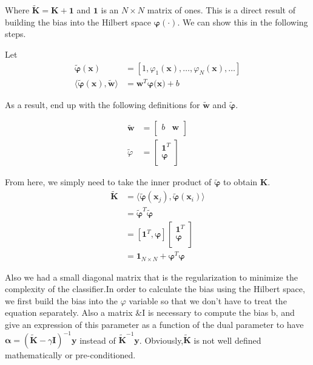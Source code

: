 \documentclass[conference]{IEEEtran}
\begin{document}
Where $\mathbf{\widetilde{K}} = \mathbf{K} + \mathbf{1}$ and $\mathbf{1}$ is an $N \times N$ matrix of ones. This is a direct result
of building the bias into the Hilbert space $\mathbf{\varphi(\cdot)}$. We can show this in the following steps. 

Let 
\begin{align*}
\mathbf{\widetilde{\varphi}(x)} &= [1, \varphi_1(\mathbf{x}),  \ldots, \varphi_N(\mathbf{x}), \ldots ] \\
\langle\mathbf{\widetilde{\varphi}(x)}, \mathbf{\widetilde{w}} \rangle &= \mathbf{w}^T\mathbf{\varphi(\mathbf{x}}) + b 
\end{align*}

As a result, end up with the following definitions for $\mathbf{\widetilde{w}}$ and $\mathbf{\widetilde{\varphi}}$.
\newcommand{\newPhi}{\mathbf{\widetilde{\varphi}}}

\begin{align*}
 \mathbf{\widetilde{w}} &= 
\begin{bmatrix}
b & \mathbf{w}  \\
\end{bmatrix} \\
\widetilde{\varphi} &= 
\begin{bmatrix} 
\mathbf{1}^T \\
\mathbf{\varphi} \\
\end{bmatrix}
\end{align*}

From here, we simply need to take the inner product of $\mathbf{\widetilde{\varphi}}$ to obtain $\mathbf{K}$. 
\begin{align*}
 \widetilde{\mathbf{K} }&= \langle \newPhi(\mathbf{x}_j), \newPhi(\mathbf{x}_i) \rangle \\
 & = \newPhi^T\newPhi \\
 &= [\mathbf{1}^T, \mathbf{\varphi}] 
 \begin{bmatrix}
 \mathbf{1}^T \\
\mathbf{\varphi} \\
 \end{bmatrix} \\
 &= \mathbf{1}_{N \times N} + \mathbf{\varphi}^T\mathbf{\varphi}
\end{align*}

Also we had a small diagonal matrix that is the regularization to minimize the complexity of the classifier.In order to calculate the bias using the Hilbert space, we first build the bias into the $\varphi$ variable so that we don't have to treat the equation separately. 
Also a matrix \&I is necessary to compute the bias b,
and give an expression of this parameter as a function of the dual
parameter  to have $\mathbf{\alpha} = (\mathbf{\widetilde{K}} - \gamma \mathbf{I})^{-1} \mathbf{y}$ 
instead of $\mathbf{\widetilde{K}}^{-1}\mathbf{y}$. Obviously,$\mathbf{\widetilde{K}}$ is not well defined mathematically or pre-conditioned.
\end{document}
